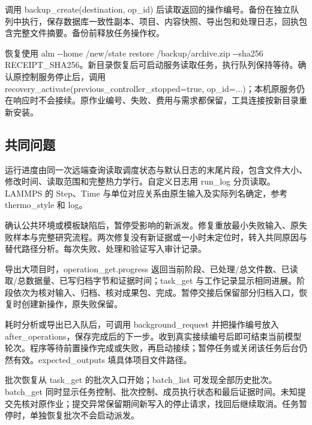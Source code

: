\documentclass[11pt,a4paper]{ctexart}
\begin{document}
调用 backup\_\allowbreak{}create(destination, op\_\allowbreak{}id) 后读取返回的操作编号。备份在独立队列中执行，保存数据库一致性副本、项目、内容快照、导出包和处理日志，回执包含完整文件摘要。备份前释放任务操作权。



恢复使用 alm -{}-home /\allowbreak{}new/\allowbreak{}state restore /\allowbreak{}backup/\allowbreak{}archive.zip -{}-sha256 RECEIPT\_\allowbreak{}SHA256。新目录恢复后可启动服务读取任务，执行队列保持等待。确认原控制服务停止后，调用 recovery\_\allowbreak{}activate(previous\_\allowbreak{}controller\_\allowbreak{}stopped=true, op\_\allowbreak{}id=...)；本机原服务仍在响应时不会接续。原作业编号、失败、费用与需求都保留，工具连接按新目录重新安装。



\subsection{共同问题}


运行进度由同一次远端查询读取调度状态与默认日志的末尾片段，包含文件大小、修改时间、读取范围和完整热力学行。自定义日志用 run\_\allowbreak{}log 分页读取。LAMMPS 的 Step、Time 与单位对应关系由原生输入及实际列名确定，参考 thermo\_\allowbreak{}style 和 log。



确认公共环境或模板缺陷后，暂停受影响的新派发。修复重放最小失败输入、原失败样本与完整研究流程。两次修复没有新证据或一小时未定位时，转入共同原因与替代路径分析。每次失败、处理和验证写入审计记录。



导出大项目时，operation\_\allowbreak{}get.progress 返回当前阶段、已处理/\allowbreak{}总文件数、已读取/\allowbreak{}总数据量、已写归档字节和证据时间；task\_\allowbreak{}get 与工作记录显示相同进展。阶段依次为核对输入、归档、核对成果包、完成。暂停交接后保留部分归档入口，恢复时创建新操作，原失败保留。



耗时分析或导出已入队后，可调用 background\_\allowbreak{}request 并把操作编号放入 after\_\allowbreak{}operations，保存完成后的下一步。收到真实接续编号后即可结束当前模型轮次。程序等待前置操作完成或失败，再启动接续；暂停任务或关闭该任务后台仍然有效。expected\_\allowbreak{}outputs 填具体项目文件路径。



批次恢复从 task\_\allowbreak{}get 的批次入口开始；batch\_\allowbreak{}list 可发现全部历史批次。batch\_\allowbreak{}get 同时显示任务控制、批次控制、成员执行状态和最后证据时间。未知提交先核对原作业；提交异常保留期间新写入的停止请求，找回后继续取消。任务暂停时，单独恢复批次不会启动派发。
\end{document}
